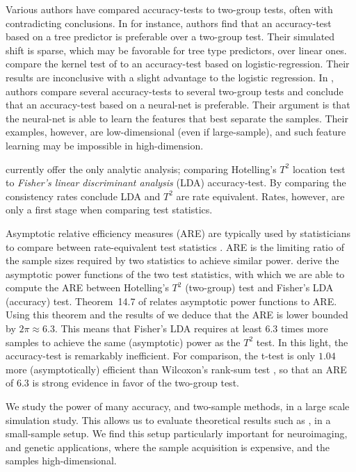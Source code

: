 \documentclass[]{bio}
\begin{document}
Various authors have compared accuracy-tests to two-group tests, often with contradicting conclusions.
In \cite{yu2007two} for instance, authors find that an accuracy-test based on a tree predictor is preferable over a two-group test. 
Their simulated shift is sparse, which may be favorable for tree type predictors, over linear ones. 
\citet{olivetti2013kernel} compare the kernel test of \cite{gretton_kernel_2012-1} to an accuracy-test based on logistic-regression.
Their results are inconclusive with a slight advantage to the logistic regression.
In \cite{lopez2016revisiting}, authors compare several accuracy-tests to several two-group tests and conclude that an accuracy-test based on a neural-net is preferable. 
Their argument is that the neural-net is able to learn the features that best separate the samples. 
Their examples, however, are low-dimensional (even if large-sample), and such feature learning may be impossible in high-dimension.

\cite{ramdas_classification_2016} currently offer the only analytic analysis; comparing Hotelling's $T^2$ location test to \emph{Fisher's linear discriminant analysis} (LDA) accuracy-test. 
By comparing the consistency rates \cite{ramdas_classification_2016} conclude LDA and $T^2$ are rate equivalent.
Rates, however, are only a first stage when comparing test statistics. 

Asymptotic relative efficiency measures (ARE) are typically used by statisticians to compare between rate-equivalent test statistics \citep{vaart_asymptotic_1998}.
ARE is the limiting ratio of the sample sizes required by two statistics to achieve similar power. 
\citet{ramdas_classification_2016} derive the asymptotic power functions of the two test statistics, with which we are able to compute the ARE between Hotelling's $T^2$ (two-group) test and Fisher's LDA (accuracy) test.
Theorem~14.7 of \cite{vaart_asymptotic_1998} relates asymptotic power functions to ARE.
Using this theorem and the results of \cite{ramdas_classification_2016} we deduce that the ARE is lower bounded by $2 \pi \approx 6.3$.
This means that Fisher's LDA requires at least $6.3$ times more samples to achieve the same (asymptotic) power as the $T^2$ test. 
In this light, the accuracy-test is remarkably inefficient.  
For comparison, the t-test is only $1.04$ more (asymptotically) efficient than Wilcoxon's rank-sum test \citep{lehmann_parametric_2009}, so that an ARE of $6.3$ is strong evidence in favor of the two-group test. 

We study the power of many accuracy, and two-sample methods, in a large scale simulation study. 
This allows us to evaluate theoretical results such as \citet{ramdas_classification_2016}, in a small-sample setup.
We find this setup particularly important for neuroimaging, and genetic applications, where the sample acquisition is expensive, and the samples high-dimensional. 
\end{document}
